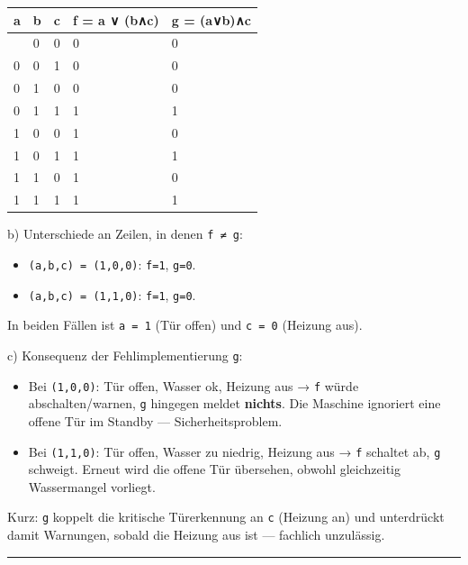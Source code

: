 \documentclass[11pt, a4paper]{article}
\begin{document}
{\small
\begin{tabularx}{\linewidth}{XXXXX}
\hline
\rowcolor{tableheadbg}
{\color{white}\textbf{a}} & {\color{white}\textbf{b}} & {\color{white}\textbf{c}} & {\color{white}\textbf{f = a ∨ (b∧c)}} & {\color{white}\textbf{g = (a∨b)∧c}} \\[2pt]
\hline
\endhead
\hline
\endfoot
0 & 0 & 0 & 0 & 0 \\
0 & 0 & 1 & 0 & 0 \\
0 & 1 & 0 & 0 & 0 \\
0 & 1 & 1 & 1 & 1 \\
1 & 0 & 0 & 1 & 0 \\
1 & 0 & 1 & 1 & 1 \\
1 & 1 & 0 & 1 & 0 \\
1 & 1 & 1 & 1 & 1 \\
\end{tabularx}
}


b) Unterschiede an Zeilen, in denen \texttt{f ≠ g}:

\begin{itemize}
  \item \texttt{(a,b,c) = (1,0,0)}: \texttt{f=1}, \texttt{g=0}.
  \item \texttt{(a,b,c) = (1,1,0)}: \texttt{f=1}, \texttt{g=0}.
\end{itemize}

In beiden Fällen ist \texttt{a = 1} (Tür offen) und \texttt{c = 0} (Heizung aus).


c) Konsequenz der Fehlimplementierung \texttt{g}:


\begin{itemize}
  \item Bei \texttt{(1,0,0)}: Tür offen, Wasser ok, Heizung aus → \texttt{f} würde abschalten/warnen, \texttt{g} hingegen meldet \textbf{nichts}. Die Maschine ignoriert eine offene Tür im Standby — Sicherheitsproblem.
  \item Bei \texttt{(1,1,0)}: Tür offen, Wasser zu niedrig, Heizung aus → \texttt{f} schaltet ab, \texttt{g} schweigt. Erneut wird die offene Tür übersehen, obwohl gleichzeitig Wassermangel vorliegt.
\end{itemize}

Kurz: \texttt{g} koppelt die kritische Türerkennung an \texttt{c} (Heizung an) und unterdrückt damit Warnungen, sobald die Heizung aus ist — fachlich unzulässig.



\noindent\textcolor{rulegray}{\rule{\linewidth}{0.4pt}}
\end{document}
